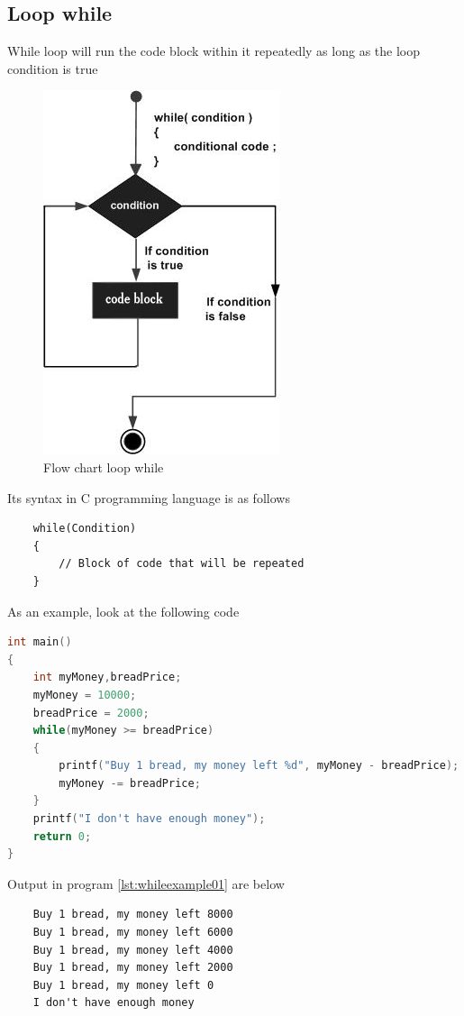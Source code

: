 \subsection{Loop while}
While loop will run the code block within it repeatedly as long as the loop condition is true


\begin{figure}[H]
		\centering
		\includegraphics[width=0.4\linewidth]{../P2/img/whileloop.png}
		\caption{Flow chart loop while}
		\label{fig:whileloop}
\end{figure}

Its syntax in C programming language is as follows
\begin{verbatim}
    while(Condition)
    {
        // Block of code that will be repeated
    }
\end{verbatim}

As an example, look at the following code
\begin{lstlisting}[language=c,caption = While implementation example,label=lst:whileexample01]
int main()
{
	int myMoney,breadPrice;
	myMoney = 10000;
	breadPrice = 2000;
	while(myMoney >= breadPrice)
	{
	    printf("Buy 1 bread, my money left %d", myMoney - breadPrice);
	    myMoney -= breadPrice;
	}
	printf("I don't have enough money");
	return 0;
}
\end{lstlisting}  
Output in program \ref{lst:whileexample01} are below
\begin{verbatim}
    Buy 1 bread, my money left 8000
    Buy 1 bread, my money left 6000
    Buy 1 bread, my money left 4000
    Buy 1 bread, my money left 2000
    Buy 1 bread, my money left 0
    I don't have enough money
\end{verbatim}

